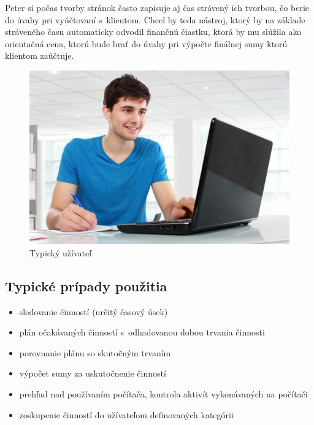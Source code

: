 \documentclass[]{article}
\begin{document}
Peter si počas tvorby stránok často zapisuje aj čas strávený ich tvorbou, čo berie do úvahy pri vyúčtovaní s~klientom. Chcel by teda nástroj, ktorý by na základe stráveného času automaticky odvodil finančnú čiastku, ktorá by mu slúžila ako orientačná cena, ktorú bude brať do úvahy pri výpočte finálnej sumy ktorú klientom zaúčtuje. 

\begin{figure}[h!]
	\includegraphics[width=\textwidth]{persona}
	\caption{Typický užívateľ}
\end{figure}

\newpage

\subsection{Typické prípady použitia}

\begin{itemize}
	\item sledovanie činností (určitý časový úsek)
	\item plán očakávaných činností s~odhadovanou dobou trvania činnosti
	\item porovnanie plánu so skutočným trvaním
	\item výpočet sumy za uskutočnenie činností
	\item prehľad nad používaním počítača, kontrola aktivít vykonávaných na počítači	
	\item zoskupenie činností do užívateľom definovaných kategórii
\end{itemize}
\end{document}

